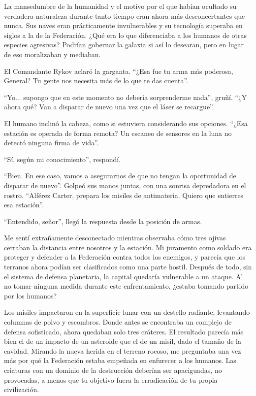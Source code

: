 \documentclass[spanish,12pt,a4paper,oneside,titlepage]{book}
\begin{document}
    La mansedumbre de la humanidad y el motivo por el que habían ocultado su verdadera naturaleza durante tanto tiempo eran ahora más desconcertantes que nunca. Sus naves eran prácticamente invulnerables y su tecnología superaba en siglos a la de la Federación. ¿Qué era lo que diferenciaba a los humanos de otras especies agresivas? Podrían gobernar la galaxia si así lo desearan, pero en lugar de eso moralizaban y mediaban.

    El Comandante Rykov aclaró la garganta. ``¿Esa fue tu arma más poderosa, General? Tu gente nos necesita más de lo que te das cuenta''.

    ``Yo... supongo que en este momento no debería sorprenderme nada'', gruñí. ``¿Y ahora qué? Van a disparar de nuevo una vez que el láser se recargue''.

    El humano inclinó la cabeza, como si estuviera considerando sus opciones. ``¿Esa estación es operada de forma remota? Un escaneo de sensores en la luna no detectó ninguna firma de vida''.

    ``Sí, según mi conocimiento'', respondí.

    ``Bien. En ese caso, vamos a asegurarnos de que no tengan la oportunidad de disparar de nuevo''. Golpeó sus manos juntas, con una sonrisa depredadora en el rostro. ``Alférez Carter, prepara los misiles de antimateria. Quiero que entierres esa estación''.

    ``Entendido, señor'', llegó la respuesta desde la posición de armas.

    Me sentí extrañamente desconectado mientras observaba cómo tres ojivas cerraban la distancia entre nosotros y la estación. Mi juramento como soldado era proteger y defender a la Federación contra todos los enemigos, y parecía que los terranos ahora podían ser clasificados como una parte hostil. Después de todo, sin el sistema de defensa planetaria, la capital quedaría vulnerable a un ataque. Al no tomar ninguna medida durante este enfrentamiento, ¿estaba tomando partido por los humanos?

    Los misiles impactaron en la superficie lunar con un destello radiante, levantando columnas de polvo y escombros. Donde antes se encontraba un complejo de defensa sofisticado, ahora quedaban solo tres cráteres. El resultado parecía más bien el de un impacto de un asteroide que el de un misil, dado el tamaño de la cavidad. Mirando la nueva herida en el terreno rocoso, me preguntaba una vez más por qué la Federación estaba empeñada en enfurecer a los humanos. Las criaturas con un dominio de la destrucción deberían ser apaciguadas, no provocadas, a menos que tu objetivo fuera la erradicación de tu propia civilización.
\end{document}

